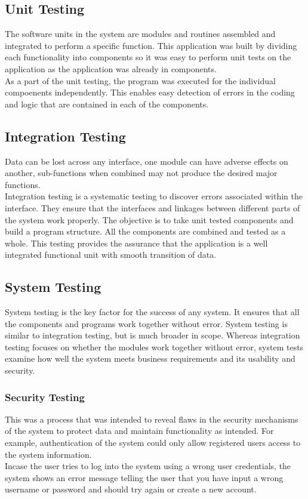 \documentclass[twoside, a4paper, 12pt]{report}
\begin{document}
\subsection{Unit Testing}
The software units in the system are modules and routines assembled and integrated to perform a specific function. This application was built by dividing each functionality into components so it was easy to perform unit tests on the application as the application was already in components.\\
\indent
As a part of the unit testing, the program was executed for the individual compoenents independently. This enables easy detection of errors in the coding and logic that are contained in each of the components.

\subsection{Integration Testing}
Data can be lost across any interface, one module can have adverse effects on another, sub-functions when combined may not produce the desired major functions.\\
\indent 
Integration testing is a systematic testing to discover errors associated within the interface. They ensure that the interfaces and linkages between different parts of the system work properly. The objective is to take unit tested components and build a program structure. All the components are combined and tested as a whole. This testing provides the assurance that the application is a well integrated functional unit with smooth transition of data.

\subsection{System Testing}
System testing is the key factor for the success of any system. It ensures that all the components and programs work together without error. System testing is similar to integration testing, but is much broader in scope. Whereas integration testing focuses on whether the modules work together without error, system tests examine how well the system meets business requirements and its usability and security.

\subsubsection{Security Testing}
This was a process that was intended to reveal flaws in the security mechanisms of the system to protect data and maintain functionality as intended. For example, authentication of the system could only allow registered users access to the system information.\\
\indent
Incase the user tries to log into the system using a wrong user credentials, the system shows an error message telling the user that you have input a wrong username or password and should try again or create a new account.
\end{document}
